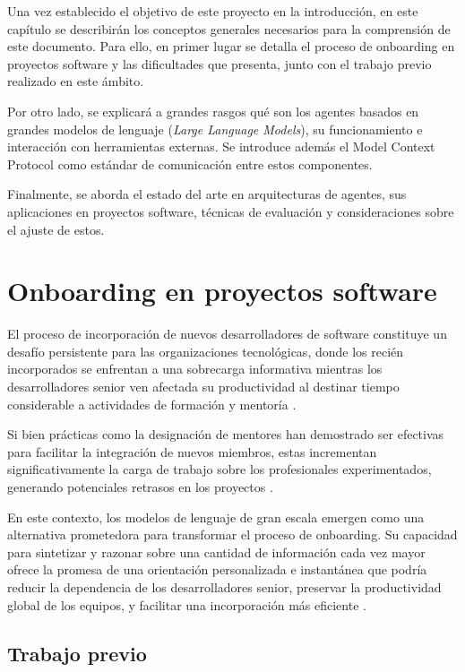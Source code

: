 Una vez establecido el objetivo de este proyecto en la introducción, en este capítulo se describirán los conceptos generales necesarios para la comprensión de este documento. Para ello, en primer lugar se detalla el proceso de onboarding en proyectos software y las dificultades que presenta, junto con el trabajo previo realizado en este ámbito.

Por otro lado, se explicará a grandes rasgos qué son los agentes basados en grandes modelos de lenguaje (\textit{Large Language Models}), su funcionamiento e interacción con herramientas externas. Se introduce además el Model Context Protocol como estándar de comunicación entre estos componentes.


Finalmente, se aborda el estado del arte en arquitecturas de agentes, sus aplicaciones en proyectos software, técnicas de evaluación y consideraciones sobre el ajuste de estos.

\section{Onboarding en proyectos software}
El proceso de incorporación de nuevos desarrolladores de software constituye un desafío persistente para las organizaciones tecnológicas, donde los recién incorporados se enfrentan a una sobrecarga informativa mientras los desarrolladores senior ven afectada su productividad al destinar tiempo considerable a actividades de formación y mentoría \cite{sim_ramp-up_1998}. 

Si bien prácticas como la designación de mentores han demostrado ser efectivas para facilitar la integración de nuevos miembros, estas incrementan significativamente la carga de trabajo sobre los profesionales experimentados, generando potenciales retrasos en los proyectos \cite{steinmacher_systematic_2015}.

En este contexto, los modelos de lenguaje de gran escala emergen como una alternativa prometedora para transformar el proceso de onboarding. Su capacidad para sintetizar y razonar sobre una cantidad de información cada vez mayor ofrece la promesa de una orientación personalizada e instantánea que podría reducir la dependencia de los desarrolladores senior, preservar la productividad global de los equipos, y facilitar una incorporación más eficiente \cite{ritz_artificial_2023}.

\subsection{Trabajo previo}
\label{sec:trabajo_previo}

